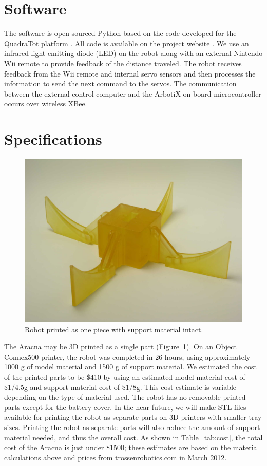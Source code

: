 \documentclass[letterpaper]{article}
\begin{document}
\section{Software}

The software is open-sourced Python based on the
code developed for the QuadraTot platform \citep{JY}. All code is
available on the project website \citep{WEB}. We use an infrared light
emitting diode (LED) on the robot along with an external Nintendo Wii
remote to provide feedback of the distance traveled. The robot
receives feedback from the Wii remote and internal servo sensors and
then processes the information to send the next command to
the servos. The communication between the external control computer
and the ArbotiX on-board microcontroller occurs over wireless XBee.



\section{Specifications}

\begin{figure}[t]
\begin{center}
\includegraphics[width=.37\textwidth]{fig2.jpg}
\caption{Robot printed as one piece with support material intact.}
\label{fig2}
\end{center}
\end{figure}

The Aracna may be 3D printed as a single part (Figure~\ref{fig2}). On
an Object Connex500 printer, the robot was completed in 26 hours,
using approximately 1000 g of model material and 1500 g of support
material. We estimated the cost of the printed parts to be \$410 by
using an estimated model material cost of \$1/4.5g and support
material cost of \$1/8g. This cost estimate is variable depending on
the type of material used. The robot has no removable printed parts
except for the battery cover. In the near future, we will make STL files
available for printing the robot as separate parts on
3D printers with smaller tray sizes. Printing the robot as separate parts
will also reduce the amount of support material needed, and thus the
overall cost. As shown in Table~\ref{tab:cost}, the total cost of the
Aracna is just under \$1500; these estimates are based on the material
calculations above and prices from trossenrobotics.com in March 2012.
\end{document}
